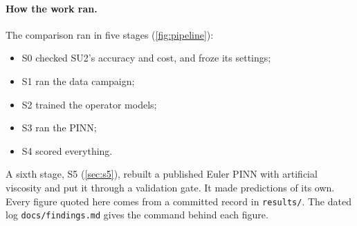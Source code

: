 \documentclass[11pt]{article}
\begin{document}
\paragraph{How the work ran.}
The comparison ran in five stages (\cref{fig:pipeline}):
\begin{itemize}
  \item S0 checked SU2's accuracy and cost, and froze its settings;
  \item S1 ran the data campaign;
  \item S2 trained the operator models;
  \item S3 ran the PINN;
  \item S4 scored everything.
\end{itemize}
A sixth stage, S5 (\cref{sec:s5}), rebuilt a published Euler PINN with artificial viscosity and
put it through a validation gate. It made predictions of its own.
Every figure quoted here comes from a committed record in \texttt{results/}. The dated log
\texttt{docs/findings.md} gives the command behind each figure.
\end{document}

